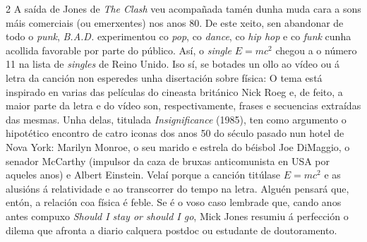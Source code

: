 \documentclass[simple]{revista}
\begin{document}
\begin{multicols}{2}
A saída de Jones de {\it The Clash} veu acompañada tamén dunha muda cara a 
sons máis comerciais (ou emerxentes) nos anos 80. De este xeito, sen abandonar 
de todo o {\it punk}, {\it B.A.D.} experimentou co {\it pop}, co {\it dance}, 
co {\it hip hop} e co {\it funk} cunha acollida favorable por parte do público. 
Así, o {\it single} $E=mc^2$ chegou a o número 11 na lista de {\it singles} de 
Reino Unido. Iso sí, se botades un ollo ao vídeo ou á letra da canción non 
esperedes unha disertación sobre física: O tema está inspirado en varias das 
películas do cineasta británico Nick Roeg e, de feito, a maior parte da letra 
e do vídeo son, respectivamente, frases e secuencias extraídas das mesmas. 
Unha delas, titulada {\it Insignificance} (1985), ten como argumento o 
hipotético encontro de catro iconas dos anos 50 do século pasado nun hotel de 
Nova York: Marilyn Monroe, o seu marido e estrela do béisbol Joe DiMaggio, o 
senador McCarthy (impulsor da caza de bruxas anticomunista en USA por aqueles 
anos) e Albert Einstein. Velaí porque a canción titúlase $E=mc^2$ e as alusións 
á relatividade e ao transcorrer do tempo na letra. Alguén pensará que, entón, a 
relación coa física é feble. Se é o voso caso lembrade que, cando anos antes 
compuxo {\it Should I stay or should I go}, Mick Jones resumiu á perfección o 
dilema que afronta a diario calquera postdoc ou estudante de doutoramento.

\end{multicols}
\end{document}
